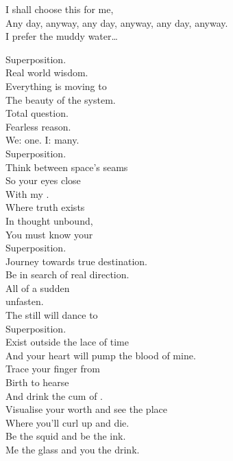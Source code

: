 I shall choose this  for me, \\
Any day, anyway, any day, anyway, any day, anyway. \\

I prefer the muddy water… \\





Superposition. \\
Real world wisdom. \\
Everything is moving to \\
The beauty of the system. \\

Total question. \\
Fearless reason. \\
We: one. I: many. \\
Superposition. \\

Think between space's seams \\
So your eyes close \\
With my . \\
Where truth exists \\
In thought unbound, \\
You must know your \\
Superposition. \\

Journey towards true destination. \\
Be in search of real direction. \\

All of a sudden \\
 unfasten. \\
The still will dance to \\
Superposition. \\

Exist outside the lace of time \\
And your heart will pump the blood of mine. \\
Trace your finger from \\
Birth to hearse \\
And drink the cum of . \\

Visualise your worth and see the place \\
Where you'll curl up and die. \\
Be the squid and be the ink. \\
Me the glass and you the drink. \\

